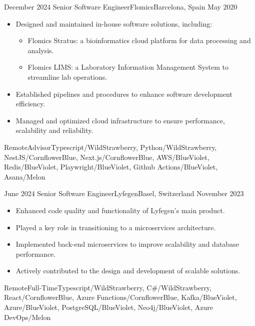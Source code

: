 %
%
%
\begin{experiences}

  \experience
  {December 2024} {Senior Software Engineer}{Flomics}{Barcelona, Spain}
  {May 2020}{\begin{itemize}
    \item  Designed and maintained in-house software solutions, including:
    \begin{itemize}
    \item Flomics Stratus: a bioinformatics cloud platform for data processing and analysis.
    \item Flomics LIMS: a Laboratory Information Management System to streamline lab operations.
    \end{itemize}
    \item Established pipelines and procedures to enhance software development efficiency.
    \item Managed and optimized cloud infrastructure to ensure performance, scalability and reliability.
  \end{itemize}}
  {Remote}{Advisor}{Typescript/WildStrawberry, Python/WildStrawberry, NestJS/CornflowerBlue, Next.js/CornflowerBlue, AWS/BlueViolet, Redis/BlueViolet, Playwright/BlueViolet, Github Actions/BlueViolet, Asana/Melon}
  
  \emptySeparator

  \experience
  {June 2024} {Senior Software Engineer}{Lyfegen}{Basel, Switzerland}
  {November 2023}{\begin{itemize}
    \item Enhanced code quality and functionality of Lyfegen's main product.
    \item Played a key role in transitioning to a microservices architecture.
    \item Implemented back-end microservices to improve scalability and database performance.
    \item Actively contributed to the design and development of scalable solutions.
  \end{itemize}}
  {Remote}{Full-Time}{Typescript/WildStrawberry, C\#/WildStrawberry, React/CornflowerBlue, Azure Functions/CornflowerBlue, Kafka/BlueViolet, Azure/BlueViolet, PostgreSQL/BlueViolet, Neo4j/BlueViolet, Azure DevOps/Melon}


\end{experiences}
